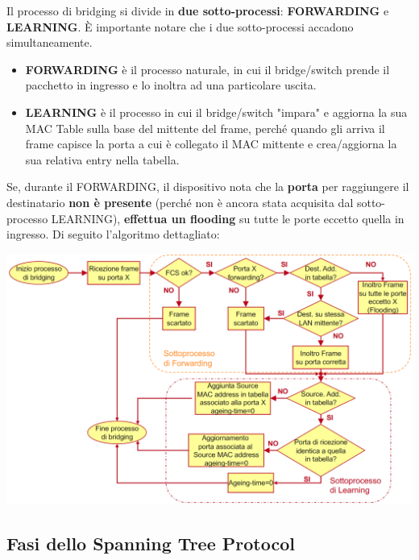 \documentclass[12pt]{article}
\begin{document}
Il processo di bridging si divide in \textbf{due sotto-processi}: \textbf{FORWARDING} e \textbf{LEARNING}. È importante notare che i due sotto-processi accadono simultaneamente.
\begin{itemize}
    \item \textbf{FORWARDING} è il processo naturale, in cui il bridge/switch prende il pacchetto in ingresso e lo inoltra ad una particolare uscita.
    \item \textbf{LEARNING} è il processo in cui il bridge/switch "impara" e aggiorna la sua MAC Table sulla base del mittente del frame, perché quando gli arriva il frame capisce la porta a cui è collegato il MAC mittente e crea/aggiorna la sua relativa entry nella tabella.
\end{itemize}
Se, durante il FORWARDING, il dispositivo nota che la \textbf{porta} per raggiungere il destinatario \textbf{non è presente} (perché non è ancora stata acquisita dal sotto-processo LEARNING), \textbf{effettua un flooding} su tutte le porte eccetto quella in ingresso. Di seguito l'algoritmo dettagliato:
\begin{center}
    \includegraphics[scale=0.35]{bridging_process}
\end{center}

\subsection{Fasi dello Spanning Tree Protocol}
\end{document}
